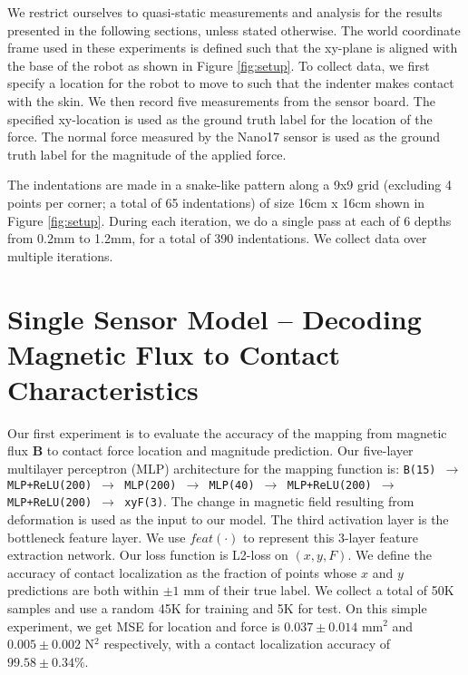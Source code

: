 \documentclass{article}
\let\vec\mathbf
\begin{document}
We restrict ourselves to quasi-static measurements and analysis for the results presented in the following sections, unless stated otherwise. The world coordinate frame used in these experiments is defined such that the xy-plane is aligned with the base of the robot as shown in Figure \ref{fig:setup}. To collect data, we first specify a location for the robot to move to such that the indenter makes contact with the skin. We then record five measurements from the sensor board. The specified xy-location is used as the ground truth label for the location of the force. The normal force measured by the Nano17 sensor is used as the ground truth label for the magnitude of the applied force.

The indentations are made in a snake-like pattern along a 9x9 grid (excluding 4 points per corner; a total of 65 indentations) of size 16cm x 16cm shown in Figure \ref{fig:setup}. During each iteration, we do a single pass at each of 6 depths from 0.2mm to 1.2mm, for a total of 390 indentations. We collect data over multiple iterations.

\vspace{-0.05in}
\section{Single Sensor Model -- Decoding Magnetic Flux to Contact Characteristics}
\vspace{-0.1in}
Our first experiment is to evaluate the accuracy of the mapping from magnetic flux $\vec{B}$ to contact force location and magnitude prediction. Our five-layer multilayer perceptron (MLP) architecture for the mapping function is: {\tt B(15) $\rightarrow$ MLP+ReLU(200) $\rightarrow$ MLP(200) $\rightarrow$ MLP(40) $\rightarrow$ MLP+ReLU(200) $\rightarrow$ MLP+ReLU(200) $\rightarrow$ xyF(3)}. The change in magnetic field resulting from deformation is used as the input to our model. The third activation layer is the bottleneck feature layer. We use $feat(\cdot)$ to represent this 3-layer feature extraction network. Our loss function is L2-loss on $(x,y,F)$. We define the accuracy of contact localization as the fraction of points whose $x$ and $y$ predictions are both within $\pm 1$ mm of their true label. We collect a total of 50K samples and use a random 45K for training and 5K for test. On this simple experiment, we get MSE for location and force is $0.037 \pm 0.014$ mm$^2$ and $0.005 \pm 0.002$ N$^2$ respectively, with a contact localization accuracy of $99.58 \pm 0.34\%$.
\end{document}
